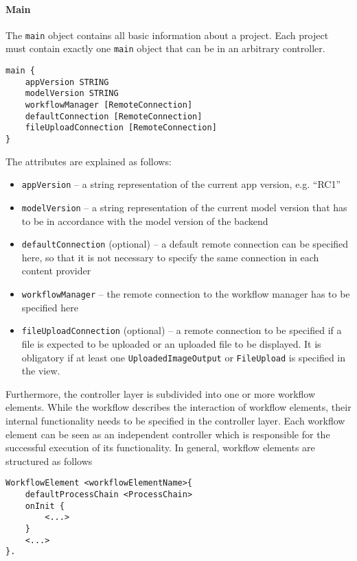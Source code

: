 
\paragraph{Main}
The \lstinline!main! object contains all basic information about a project. Each project must contain exactly one \lstinline!main! object that can be in an arbitrary controller.

\begin{lstlisting}
main {
	appVersion STRING
	modelVersion STRING
	workflowManager [RemoteConnection]
	defaultConnection [RemoteConnection]
	fileUploadConnection [RemoteConnection]
}
\end{lstlisting}

The attributes are explained as follows:
\begin{itemize}
\item \lstinline!appVersion! -- a string representation of the current app version, e.g. \enquote{RC1}
\item  \lstinline!modelVersion! -- a string representation of the current model version that has to be in accordance with the model version of the backend
\item  \lstinline!defaultConnection! (optional) -- a default remote connection can be specified here, so that it is not necessary to specify the same connection in each content provider
\item \lstinline!workflowManager! -- the remote connection to the workflow manager has to be specified here 
\item \lstinline!fileUploadConnection! (optional) -- a remote connection to be specified if a file is expected to be uploaded or an uploaded file to be displayed. It is obligatory if at least one \lstinline!UploadedImageOutput! or \lstinline!FileUpload! is specified in the view.
\end{itemize}

Furthermore, the controller layer is subdivided into one or more workflow elements. While the workflow describes the interaction of workflow elements, their internal functionality needs to be specified in the controller layer. Each workflow element can be seen as an independent controller which is responsible for the successful execution of its functionality. In general, workflow elements are structured as follows

\begin{lstlisting}
WorkflowElement <workflowElementName>{
	defaultProcessChain <ProcessChain>
	onInit {
		<...>
	}
	<...>
}.
\end{lstlisting}

